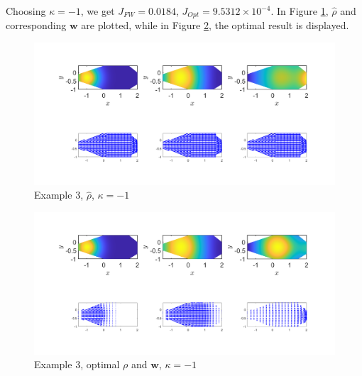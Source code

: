 \documentclass[11pt, a4paper]{article}
\theoremstyle{definition}
\newcommand{\w}{\mathbf{w}}
\begin{document}
Choosing $\kappa = -1$, we get $J_{FW} = 0.0184$, $J_{Opt} = 9.5312 \times 10^{-4}$. In Figure \ref{FEx3a}, $\widehat \rho$ and corresponding $\w$ are plotted, while in Figure \ref{FEx3b}, the optimal result is displayed.
\begin{figure}[h]
	\centering
	\includegraphics[scale=0.3]{FW3n1.png}
	\caption{Example 3, $\widehat \rho$, $\kappa = -1$} 
	\label{FEx3a}
\end{figure}
\begin{figure}[h]
	\centering
	\includegraphics[scale=0.3]{Opt3n1.png}
	\caption{Example 3, optimal $\rho$ and $\w$, $\kappa = -1$} 
	\label{FEx3b}
\end{figure}	
	
\end{document}
